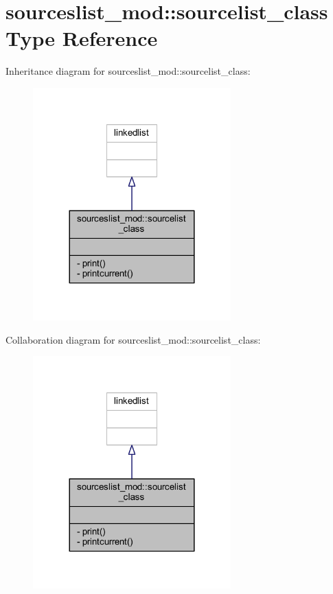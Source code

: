 \hypertarget{structsourceslist__mod_1_1sourcelist__class}{}\section{sourceslist\+\_\+mod\+:\+:sourcelist\+\_\+class Type Reference}
\label{structsourceslist__mod_1_1sourcelist__class}


Inheritance diagram for sourceslist\+\_\+mod\+:\+:sourcelist\+\_\+class\+:\nopagebreak
\begin{figure}[H]
\begin{center}
\leavevmode
\includegraphics[width=216pt]{structsourceslist__mod_1_1sourcelist__class__inherit__graph}
\end{center}
\end{figure}


Collaboration diagram for sourceslist\+\_\+mod\+:\+:sourcelist\+\_\+class\+:\nopagebreak
\begin{figure}[H]
\begin{center}
\leavevmode
\includegraphics[width=216pt]{structsourceslist__mod_1_1sourcelist__class__coll__graph}
\end{center}
\end{figure}
